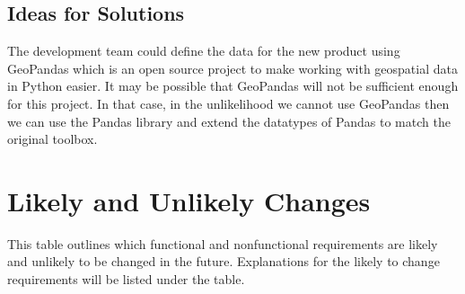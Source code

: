 \documentclass[12pt, titlepage]{article}
\begin{document}
\subsection{Ideas for Solutions}
The development team could define the data for the new product using GeoPandas which is an open source project to make working with geospatial data in Python easier.\newline \newline
It may be possible that GeoPandas will not be sufficient enough for this project. In that case, in the unlikelihood we cannot use GeoPandas then we can use the Pandas library and extend the
datatypes of Pandas to match the original toolbox.

\newpage

\section{Likely and Unlikely Changes}
This table outlines which functional and nonfunctional requirements are likely and unlikely to be changed in the future. Explanations for the likely to change requirements will be listed under the table.
\vspace{2em}
\end{document}
